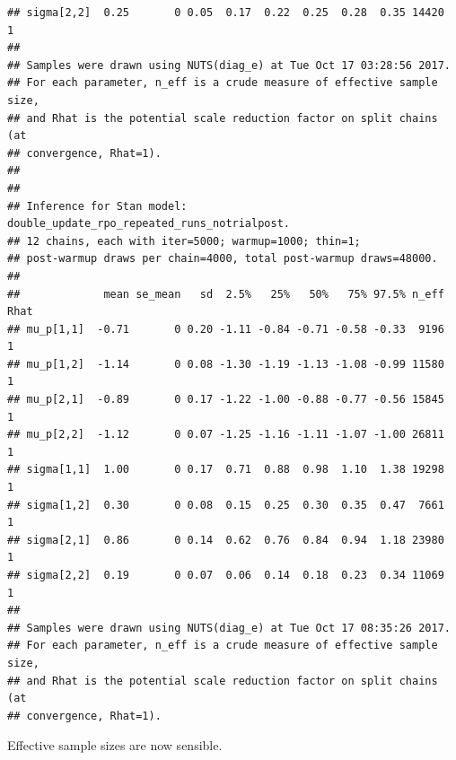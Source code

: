 \documentclass{article}\usepackage[]{graphicx}\usepackage[]{color}
\makeatletter
\newenvironment{kframe}{%
 \def\at@end@of@kframe{}%
 \ifinner\ifhmode%
  \def\at@end@of@kframe{\end{minipage}}%
  \begin{minipage}{\columnwidth}%
 \fi\fi%
 \def\FrameCommand##1{\hskip\@totalleftmargin \hskip-\fboxsep
 \colorbox{shadecolor}{##1}\hskip-\fboxsep
     \hskip-\linewidth \hskip-\@totalleftmargin \hskip\columnwidth}%
 \MakeFramed {\advance\hsize-\width
   \@totalleftmargin\z@ \linewidth\hsize
   \@setminipage}}%
 {\par\unskip\endMakeFramed%
 \at@end@of@kframe}
\newenvironment{knitrout}{}{} %
\makeatother
\begin{document}
\begin{knitrout}
\begin{kframe}
\begin{verbatim}
## sigma[2,2]  0.25       0 0.05  0.17  0.22  0.25  0.28  0.35 14420    1
## 
## Samples were drawn using NUTS(diag_e) at Tue Oct 17 03:28:56 2017.
## For each parameter, n_eff is a crude measure of effective sample size,
## and Rhat is the potential scale reduction factor on split chains (at 
## convergence, Rhat=1).
## 
## 
## Inference for Stan model: double_update_rpo_repeated_runs_notrialpost.
## 12 chains, each with iter=5000; warmup=1000; thin=1; 
## post-warmup draws per chain=4000, total post-warmup draws=48000.
## 
##             mean se_mean   sd  2.5%   25%   50%   75% 97.5% n_eff Rhat
## mu_p[1,1]  -0.71       0 0.20 -1.11 -0.84 -0.71 -0.58 -0.33  9196    1
## mu_p[1,2]  -1.14       0 0.08 -1.30 -1.19 -1.13 -1.08 -0.99 11580    1
## mu_p[2,1]  -0.89       0 0.17 -1.22 -1.00 -0.88 -0.77 -0.56 15845    1
## mu_p[2,2]  -1.12       0 0.07 -1.25 -1.16 -1.11 -1.07 -1.00 26811    1
## sigma[1,1]  1.00       0 0.17  0.71  0.88  0.98  1.10  1.38 19298    1
## sigma[1,2]  0.30       0 0.08  0.15  0.25  0.30  0.35  0.47  7661    1
## sigma[2,1]  0.86       0 0.14  0.62  0.76  0.84  0.94  1.18 23980    1
## sigma[2,2]  0.19       0 0.07  0.06  0.14  0.18  0.23  0.34 11069    1
## 
## Samples were drawn using NUTS(diag_e) at Tue Oct 17 08:35:26 2017.
## For each parameter, n_eff is a crude measure of effective sample size,
## and Rhat is the potential scale reduction factor on split chains (at 
## convergence, Rhat=1).
\end{verbatim}
\end{kframe}
\end{knitrout}
Effective sample sizes are now sensible.
\end{document}
